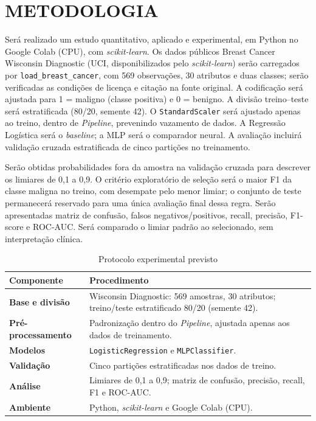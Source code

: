 \documentclass[article,11pt,oneside,a4paper,english,brazil,sumario=tradicional]{abntex2}
\begin{document}
\section{METODOLOGIA}
Será realizado um estudo quantitativo, aplicado e experimental, em Python no Google Colab (CPU), com \textit{scikit-learn}. Os dados públicos Breast Cancer Wisconsin Diagnostic (UCI, disponibilizados pelo \textit{scikit-learn}) serão carregados por \texttt{load\_breast\_cancer}, com 569 observações, 30 atributos e duas classes; serão verificadas as condições de licença e citação na fonte original. A codificação será ajustada para 1 = maligno (classe positiva) e 0 = benigno. A divisão treino--teste será estratificada (80/20, semente 42). O \texttt{StandardScaler} será ajustado apenas ao treino, dentro de \textit{Pipeline}, prevenindo vazamento de dados. A Regressão Logística será o \textit{baseline}; a MLP será o comparador neural. A avaliação incluirá validação cruzada estratificada de cinco partições no treinamento.

Serão obtidas probabilidades fora da amostra na validação cruzada para descrever os limiares de 0,1 a 0,9. O critério exploratório de seleção será o maior F1 da classe maligna no treino, com desempate pelo menor limiar; o conjunto de teste permanecerá reservado para uma única avaliação final dessa regra. Serão apresentadas matriz de confusão, falsos negativos/positivos, recall, precisão, F1-score e ROC-AUC. Será comparado o limiar padrão ao selecionado, sem interpretação clínica.

\begin{table}[!ht]
\centering
\caption{Protocolo experimental previsto}
\small
\begin{tabularx}{\textwidth}{@{}>{\bfseries}p{3.4cm}X@{}}
\toprule
Componente & Procedimento \\
\midrule
Base e divisão & Wisconsin Diagnostic: 569 amostras, 30 atributos; treino/teste estratificado 80/20 (semente 42). \\
Pré-processamento & Padronização dentro do \textit{Pipeline}, ajustada apenas aos dados de treinamento. \\
Modelos & \texttt{LogisticRegression} e \texttt{MLPClassifier}. \\
Validação & Cinco partições estratificadas nos dados de treino. \\
Análise & Limiares de 0,1 a 0,9; matriz de confusão, precisão, recall, F1 e ROC-AUC. \\
Ambiente & Python, \textit{scikit-learn} e Google Colab (CPU). \\
\bottomrule
\end{tabularx}
\par\vspace{2mm}{\footnotesize Fonte: elaboração própria (2026).}
\end{table}
\end{document}
